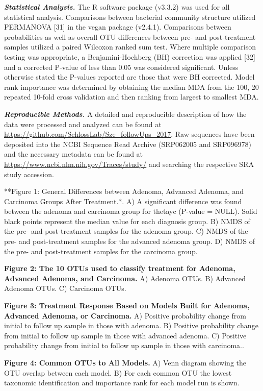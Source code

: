 \documentclass[12pt,]{article}
\begin{document}
\textbf{\emph{Statistical Analysis.}} The R software package (v3.3.2)
was used for all statistical analysis. Comparisons between bacterial
community structure utilized PERMANOVA {[}31{]} in the vegan package
(v2.4.1). Comparisons between probabilities as well as overall OTU
differences between pre- and post-treatment samples utilized a paired
Wilcoxon ranked sum test. Where multiple comparison testing was
appropriate, a Benjamini-Hochberg (BH) correction was applied {[}32{]}
and a corrected P-value of less than 0.05 was considered significant.
Unless otherwise stated the P-values reported are those that were BH
corrected. Model rank importance was determined by obtaining the median
MDA from the 100, 20 repeated 10-fold cross validation and then ranking
from largest to smallest MDA.

\textbf{\emph{Reproducible Methods.}} A detailed and reproducible
description of how the data were processed and analyzed can be found at
\url{https://github.com/SchlossLab/Sze_followUps_2017}. Raw sequences
have been deposited into the NCBI Sequence Read Archive (SRP062005 and
SRP096978) and the necessary metadata can be found at
\url{https://www.ncbi.nlm.nih.gov/Traces/study/} and searching the
respective SRA study accession.

\newpage

**Figure 1: General Differences between Adenoma, Advanced Adenoma, and
Carcinoma Groups After Treatment.*. A) A significant difference was
found between the adenoma and carcinoma group for thetayc (P-value =
NULL). Solid black points represent the median value for each diagnosis
group. B) NMDS of the pre- and post-treatment samples for the adenoma
group. C) NMDS of the pre- and post-treatment samples for the advanced
adenoma group. D) NMDS of the pre- and post-treatment samples for the
carcinoma group.

\textbf{Figure 2: The 10 OTUs used to classify treatment for Adenoma,
Advanced Adenoma, and Carcinoma.} A) Adenoma OTUs. B) Advanced Adenoma
OTUs. C) Carcinoma OTUs.

\textbf{Figure 3: Treatment Response Based on Models Built for Adenoma,
Advanced Adenoma, or Carcinoma.} A) Positive probability change from
initial to follow up sample in those with adenoma. B) Positive
probability change from initial to follow up sample in those with
advanced adenoma. C) Positive probability change from initial to follow
up sample in those with carcinoma..

\textbf{Figure 4: Common OTUs to All Models.} A) Venn diagram showing
the OTU overlap between each model. B) For each common OTU the lowest
taxonomic identification and importance rank for each model run is
shown.
\end{document}

